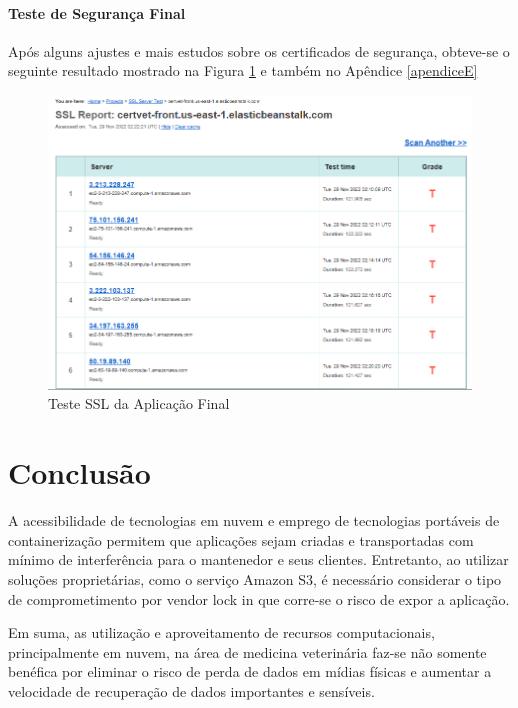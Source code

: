 \documentclass[
    12pt,               %
    openright,          %
    oneside,
    a4paper,            %
    BIBLATEX,           %
    TODO,               %
    english,            %
    brazil              %
    ]{ifsp-spo-inf-ctds}
\begin{document}
    \subsubsection{Teste de Segurança Final}

    Após alguns ajustes e mais estudos sobre os certificados de segurança, obteve-se o seguinte resultado mostrado na Figura \ref{fig:sslFrontfinal} e também no Apêndice \ref{apendiceE}

    \begin{figure}[H]
        \centering
        \includegraphics[width=0.9 \textwidth]{images/sslFront.png}
        \caption{Teste SSL da Aplicação Final}
        \label{fig:sslFrontfinal}
    \end{figure}
    

\chapter[Conclusão]{Conclusão}

    A acessibilidade de tecnologias em nuvem e emprego de tecnologias portáveis de containerização permitem que aplicações sejam criadas e transportadas com mínimo de interferência para o mantenedor e seus clientes. Entretanto, ao utilizar soluções proprietárias, como o serviço Amazon S3, é necessário considerar o tipo de comprometimento por vendor lock in que corre-se o risco de expor a aplicação.

    Em suma, as utilização e aproveitamento de recursos computacionais, principalmente em nuvem, na área de medicina veterinária faz-se não somente benéfica por eliminar o risco de perda de dados em mídias físicas e aumentar a velocidade de recuperação de dados importantes e sensíveis.
\end{document}
